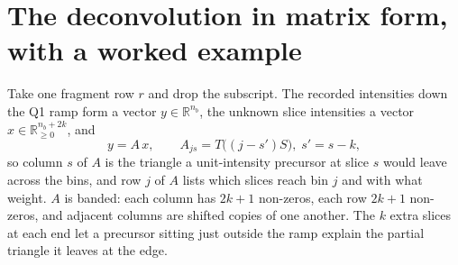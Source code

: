 \documentclass[11pt]{article}
\begin{document}
\section{The deconvolution in matrix form, with a worked example}\label{sec:matrix}
Take one fragment row $r$ and drop the subscript. The recorded intensities down the Q1 ramp form a vector $y\in\mathbb{R}^{n_b}$, the unknown slice intensities a vector $x\in\mathbb{R}^{n_b+2k}_{\ge0}$, and
\[
y = A\,x,\qquad A_{js}=T\big((j-s')S\big),\; s'=s-k,
\]
so column $s$ of $A$ is the triangle a unit-intensity precursor at slice $s$ would leave across the bins, and row $j$ of $A$ lists which slices reach bin $j$ and with what weight. $A$ is banded: each column has $2k+1$ non-zeros, each row $2k+1$ non-zeros, and adjacent columns are shifted copies of one another. The $k$ extra slices at each end let a precursor sitting just outside the ramp explain the partial triangle it leaves at the edge.
\end{document}
